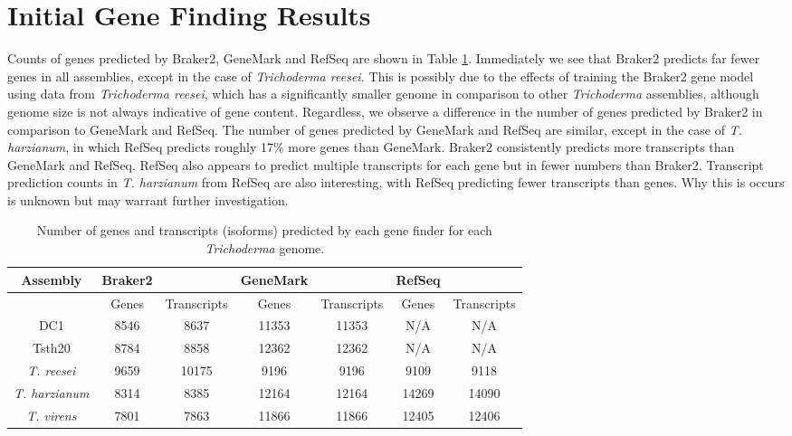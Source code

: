 \section{Initial Gene Finding Results} 
\label{section:gene-finding}

Counts of genes predicted by Braker2, GeneMark and RefSeq are shown in
Table \ref{table:gene-counts}. Immediately we see that Braker2
predicts far fewer genes in all assemblies, except in the case of
\textit{Trichoderma reesei.} This is possibly due to the effects of
training the Braker2 gene model using data from \textit{Trichoderma
  reesei}, which has a significantly smaller genome in comparison to
other \textit{Trichoderma} assemblies, although genome size is not
always indicative of gene content. Regardless, we observe a difference
in the number of genes predicted by Braker2 in comparison to GeneMark
and RefSeq. The number of genes predicted by GeneMark and RefSeq are
similar, except in the case of \textit{T. harzianum}, in which RefSeq
predicts roughly 17\% more genes than GeneMark. Braker2 consistently
predicts more transcripts than GeneMark and RefSeq. RefSeq also
appears to predict multiple transcripts for each gene but in fewer
numbers than Braker2. Transcript prediction counts in
\textit{T. harzianum} from RefSeq are also interesting, with RefSeq
predicting fewer transcripts than genes. Why this is occurs is unknown
but may warrant further investigation.

\begin{table}
  \centering
  \begin{tabular}{|c|c|c|c|c|c|c|}
    \hline
    Assembly & Braker2 & & GeneMark & & RefSeq & \\ \hline
     & Genes & Transcripts & Genes & Transcripts & Genes & Transcripts \\ \hline
    DC1 & 8546 & 8637 & 11353 & 11353 & N/A & N/A \\ \hline
    Tsth20 & 8784 & 8858 & 12362 & 12362 & N/A & N/A \\ \hline
    \textit{T. reesei} & 9659 & 10175 & 9196 & 9196 & 9109 & 9118 \\ \hline
    \textit{T. harzianum} & 8314 & 8385 & 12164 & 12164 & 14269 & 14090 \\ \hline
    \textit{T. virens} & 7801 & 7863 & 11866 & 11866 & 12405 & 12406 \\ \hline
  \end{tabular}
  \caption[Gene prediction counts]{Number of genes and transcripts
    (isoforms) predicted by each gene finder for each
    \textit{Trichoderma} genome.}
  \label{table:gene-counts}
\end{table}



